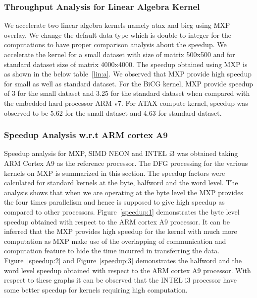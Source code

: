
%
%
%

\subsubsection{Throughput Analysis for Linear Algebra Kernel}

We accelerate two linear algebra kernels namely atax and bicg using MXP overlay. We change the default data type which is double to integer for the computations to have proper comparison analysis about the speedup. We accelerate the kernel for a small dataset with size of matrix 500x500 and for standard dataset size of matrix 4000x4000. The speedup obtained using MXP is as shown in the below table~\ref{lin:a}. We observed that MXP provide high speedup for small as well as standard dataset. For the BiCG kernel, MXP provide speedup of 3 for the small dataset and 3.25 for the standard dataset when compared with the embedded hard processor ARM v7. For ATAX compute kernel, speedup was observed to be 5.62 for the small dataset and 4.63 for standard dataset.



    
    
    \subsubsection{Speedup Analysis w.r.t ARM cortex A9}
    Speedup analysis for MXP, SIMD NEON and INTEL i3 was obtained taking ARM Cortex A9 as the reference processor. The DFG processing for the various kernels on MXP is summarized in this section. The speedup factors were calculated for standard kernels at the byte, halfword and the word level. The analysis shows that when we are operating at the byte level the MXP provides the four times parallelism and hence is supposed to give high speedup as compared to other processors. Figure~\ref{speedup:1} demonstrates the byte level speedup obtained with respect to the ARM cortex A9 processor. It can be inferred that the MXP provides high speedup for the kernel with much more computation as MXP make use of the overlapping of communication and computation feature to hide the time incurred in transferring the data. Figure~\ref{speedup:2} and Figure~\ref{speedup:3} demonstrates the halfword and the word level speedup obtained with respect to the ARM cortex A9 processor. With respect to these graphs it can be observed that the INTEL i3 processor have some better speedup for kernels requiring high computation.
  

